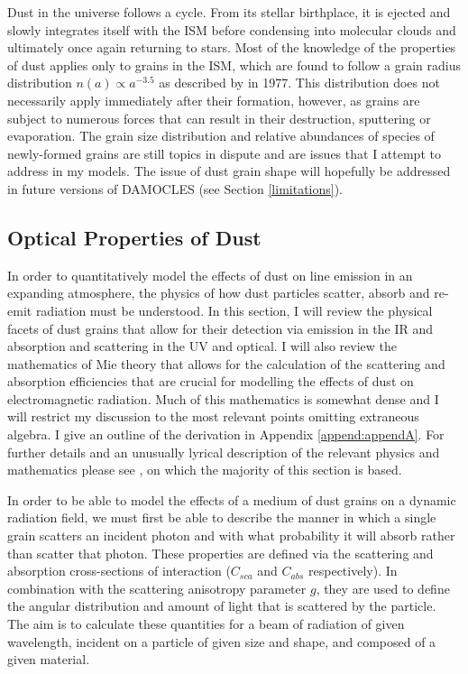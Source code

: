 Dust in the universe follows a cycle.  From its stellar birthplace, it is ejected and slowly integrates itself with the ISM before condensing into molecular clouds and ultimately once again returning to stars.  Most of the knowledge of the properties of dust applies only to grains in the ISM, which are found to follow a grain radius distribution $n(a) \propto a^{-3.5}$ as described by \citeauthor{Mathis1977} in 1977.  This distribution does not necessarily apply immediately after their formation, however, as grains are subject to numerous forces that can result in their destruction, sputtering or evaporation.  The grain size distribution and relative abundances of species of newly-formed grains are still topics in dispute and are issues that I attempt to address in my models.  The issue of dust grain shape will hopefully be addressed in future versions of DAMOCLES (see Section \ref{limitations}).



\subsection{Optical Properties of Dust}
In order to quantitatively model the effects of dust on line emission in an expanding atmosphere, the physics of how dust particles scatter, absorb and re-emit radiation must be understood. In this section, I will review the physical facets of dust grains that allow for their detection via emission in the IR and absorption and scattering in the UV and optical.  I will also review the mathematics of Mie theory \citep{Mie1908} that allows for the calculation of the scattering and absorption efficiencies that are crucial for modelling the effects of dust on electromagnetic radiation.  Much of this mathematics is somewhat dense and I will restrict my discussion to the most relevant points omitting extraneous algebra.  I give an outline of the derivation in Appendix \ref{append:appendA}.  For further details and an unusually lyrical description of the relevant physics and mathematics please see \citet{Bohren1983}, on which the majority of this section is based.  


In order to be able to model the effects of a medium of dust grains on a dynamic radiation field, we must first be able to describe the manner in which a single grain scatters an incident photon and with what probability it will absorb rather than scatter that photon. These properties are defined via the scattering and absorption cross-sections of interaction ($C_{sca}$ and $C_{abs}$ respectively).  In combination with the scattering anisotropy parameter $g$, they are used to define the angular distribution and amount of  light that is scattered by the particle.  The aim is to calculate these quantities for a beam of radiation of given wavelength, incident on a particle of given size and shape, and composed of a given material.   

